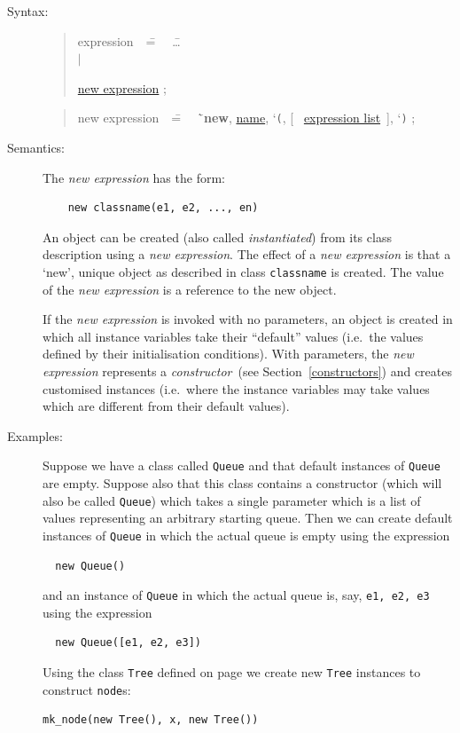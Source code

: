\documentclass{overturerepchap}
\newcommand{\Lit}[1]{`{\tt #1}\Quote}
\newcommand{\Rule}[2]{
  \begin{quote}\begin{tabbing}
    #1\index{#1}\ \ \= = \ \ \= #2  ; %
    
  \end{tabbing}\end{quote}
  }
\newcommand{\Ruleref}[1]{
  \hyperlink{rule:#1}{#1}}
\newcommand{\dsep}{\\ \> $|$ \>}
\newcommand{\Lop}[1]{`{\bf\ttfamily #1}\Quote}
\newcommand{\OptPt}[1]{[\ #1\ ]}
\begin{document}
\begin{description}
\item[Syntax:] 
  \Rule{expression}{
    \ldots \dsep
    \Ruleref{new expression} 
    }
  \Rule{new expression}{
    \Lop{new}, \Ruleref{name}, \Lit{(}, \OptPt{\Ruleref{expression list}}, \Lit{)}
  }

\item[Semantics:] The {\it new expression} has the form:

  \begin{lstlisting}
    new classname(e1, e2, ..., en)
  \end{lstlisting}
  An object can be created (also called {\em instantiated}) from its
  class description using a {\it new expression}. The effect of a
  {\it new expression} is that a `new', unique object as described in
  class {\tt classname} is created. The value of the {\it new
  expression} is a reference to the new object.

  If the {\it new expression} is invoked with no parameters, an
  object is created in which all instance variables take their
  ``default'' values (i.e.\ the values defined by their initialisation
  conditions). With parameters, the {\it new expression} represents a
  \emph{constructor}~(see Section~\ref{constructors}) and creates
  customised instances (i.e.\ where the instance variables may take
  values which are different from their default values).


\item[Examples:] Suppose we have a class called \texttt{Queue} and
  that default instances of \texttt{Queue} are empty. Suppose also
  that this class contains a constructor (which will also be called
  \texttt{Queue}) which takes a single parameter which is a list of
  values representing an arbitrary starting queue. Then we can 
  create default  instances of \texttt{Queue} in which the actual
  queue is empty using the expression
\begin{lstlisting}
  new Queue()
\end{lstlisting}
and an instance of \texttt{Queue} in which the actual
  queue is, say, \texttt{e1, e2, e3} using the expression
\begin{lstlisting}
  new Queue([e1, e2, e3])
\end{lstlisting}

Using the class \texttt{Tree} defined on page \pageref{TreeDef} we create
new \texttt{Tree} instances to construct \texttt{node}s:
\begin{lstlisting}
mk_node(new Tree(), x, new Tree())
\end{lstlisting}
    

\end{description}
\end{document}
